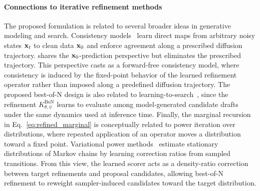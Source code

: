\paragraph{Connections to iterative refinement methods}
The proposed formulation is related to several broader ideas in generative modeling and search. 
Consistency models~\cite{consistency-model} learn direct maps from arbitrary noisy states $\mathbf{x}_t$ to clean data $\mathbf{x}_0$ and enforce agreement along a prescribed diffusion trajectory. 
\method shares the $\mathbf{x}_0$-prediction perspective but eliminates the prescribed trajectory. This perspective casts \method as a forward-free consistency model, where consistency is induced by the fixed-point behavior of the learned refinement operator rather than imposed along a predefined diffusion trajectory. 
The proposed best-of-N design is also related to learning-to-search~\citep{learning-to-search}, since the refinement $K_{\theta, \psi}^\mathrm{BoN}$ learns to evaluate among model-generated candidate drafts under the same dynamics used at inference time. 
Finally, the marginal recursion in Eq.~\eqref{eq:refined_marginal} is conceptually related to power iteration over distributions, where repeated application of an operator moves a distribution toward a fixed point. 
Variational power methods~\citep{power-iteration} estimate stationary distributions of Markov chains by learning correction ratios from sampled transitions. 
From this view, the learned scorer acts as a density-ratio correction between target refinements and proposal candidates, allowing best-of-N refinement to reweight sampler-induced candidates toward the target distribution.


